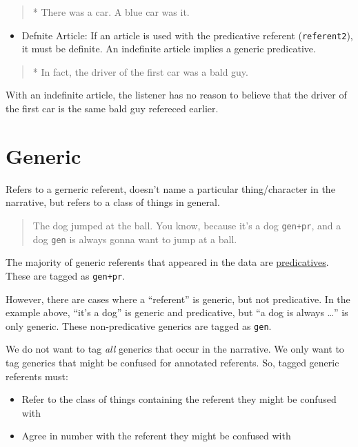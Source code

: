 \documentclass[
]{book}
\providecommand{\tightlist}{%
  \setlength{\itemsep}{0pt}\setlength{\parskip}{0pt}}
\begin{document}
\begin{quote}
* There was a car.
A blue car was it.
\end{quote}

\begin{itemize}
\tightlist
\item
  Defnite Article: If an article is used
  with the predicative referent (\texttt{referent2}),
  it must be definite.
  An indefinite article implies a generic predicative.
\end{itemize}

\begin{quote}
* In fact, the driver of the first car was a bald guy.
\end{quote}

With an indefinite article,
the listener has no reason to believe that the driver of the first car
is the same bald guy refereced earlier.

\hypertarget{generic}{%
\section{Generic}\label{generic}}

Refers to a gerneric referent,
doesn't name a particular thing/character in the narrative,
but refers to a class of things in general.

\begin{quote}
The dog jumped at the ball.
You know, because it's a dog \texttt{gen+pr},
and a dog \texttt{gen} is always gonna want to jump at a ball.
\end{quote}

The majority of generic referents that appeared in the data are \protect\hyperlink{predicative}{predicatives}. These are tagged as \texttt{gen+pr}.

However,
there are cases where a ``referent'' is generic, but not predicative.
In the example above, ``it's a dog'' is generic and predicative,
but ``a dog is always \ldots{}'' is only generic.
These non-predicative generics are tagged as \texttt{gen}.

We do not want to tag \emph{all} generics that occur in the narrative.
We only want to tag generics that might be confused for annotated referents.
So, tagged generic referents must:

\begin{itemize}
\item
  Refer to the class of things containing the referent they might be confused with
\item
  Agree in number with the referent they might be confused with
\end{itemize}
\end{document}
